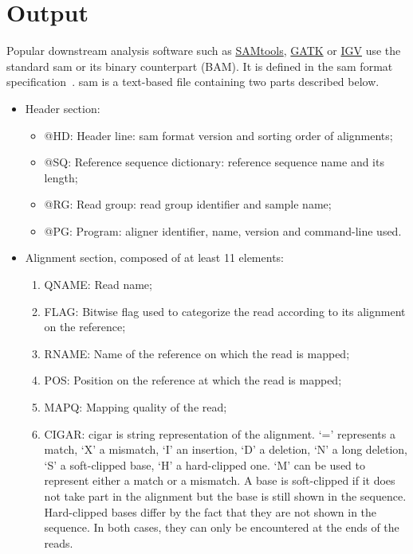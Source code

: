 \section{Output}
\label{sec:samoutput}
Popular downstream analysis software such as \href{http://www.htslib.org/}{SAMtools}, \href{https://www.broadinstitute.org/gatk/}{GATK} or \href{https://www.broadinstitute.org/igv/}{IGV} use the standard \gls{sam} or its binary counterpart (BAM).
It is defined in the \gls{sam} format specification~\cite{samspec}.
\gls{sam} is a text-based file containing two parts described below.
\begin{itemize}
    \item Header section:
    \begin{itemize}
        \item @HD: Header line: \gls{sam} format version and sorting order of alignments;
        \item @SQ: Reference sequence dictionary: reference sequence name and its length;
        \item @RG: Read group: read group identifier and sample name;
        \item @PG: Program: aligner identifier, name, version and command-line used.
    \end{itemize}
    \item Alignment section, composed of at least 11 elements:
    \begin{enumerate}
        \item QNAME: Read name;
        \item FLAG: Bitwise flag used to categorize the read according to its alignment on the reference;
        \item RNAME: Name of the reference on which the read is mapped;
        \item POS: Position on the reference at which the read is mapped;
        \item MAPQ: Mapping quality of the read;
        \item CIGAR: \gls{cigar} is string representation of the alignment.
        `=' represents a match, `X' a mismatch, `I' an insertion, `D' a deletion, `N' a long deletion, `S' a soft-clipped base, `H' a hard-clipped one.
        `M' can be used to represent either a match or a mismatch.
        A base is soft-clipped if it does not take part in the alignment but the base is still shown in the sequence.
        Hard-clipped bases differ by the fact that they are not shown in the sequence.
        In both cases, they can only be encountered at the ends of the reads.

\end{enumerate}
\end{itemize}
